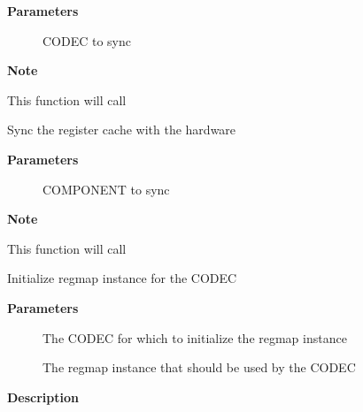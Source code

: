 \documentclass[a4paper,8pt,english]{sphinxmanual}
\begin{document}
\textbf{Parameters}
\begin{description}
\item[{}] \leavevmode
CODEC to sync

\end{description}

\textbf{Note}

This function will call 

\begin{fulllineitems}
\label{sound/kernel-api/alsa-driver-api:c.snd_soc_component_cache_sync}
Sync the register cache with the hardware

\end{fulllineitems}


\textbf{Parameters}
\begin{description}
\item[{}] \leavevmode
COMPONENT to sync

\end{description}

\textbf{Note}

This function will call 

\begin{fulllineitems}
\label{sound/kernel-api/alsa-driver-api:c.snd_soc_codec_init_regmap}
Initialize regmap instance for the CODEC

\end{fulllineitems}


\textbf{Parameters}
\begin{description}
\item[{}] \leavevmode
The CODEC for which to initialize the regmap instance

\item[{}] \leavevmode
The regmap instance that should be used by the CODEC

\end{description}

\textbf{Description}
\end{document}
